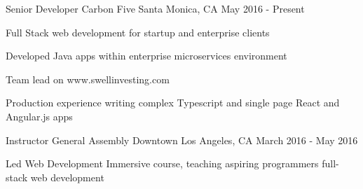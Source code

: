 

\begin{cventries}
  \cventry
    {Senior Developer} %
    {Carbon Five} %
    {Santa Monica, CA} %
    {May 2016 - Present} %
    {
      \begin{cvitems} %
        \item {Full Stack web development for startup and enterprise clients}
        \item {Developed Java apps within enterprise microservices environment}
        \item {Team lead on www.swellinvesting.com}
        \item {Production experience writing complex Typescript and single page React and Angular.js apps}
      \end{cvitems}
    }
  \cventry
    {Instructor} %
    {General Assembly} %
    {Downtown Los Angeles, CA} %
    {March 2016 - May 2016} %
    {
      \begin{cvitems} %
        \item {Led Web Development Immersive course, teaching aspiring programmers full-stack web development}
      \end{cvitems}
    }


\end{cventries}
